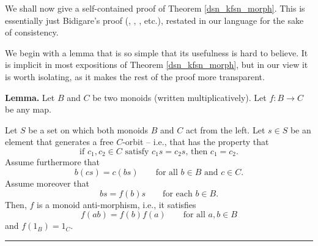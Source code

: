 \documentclass[12pt]{article}
\theoremstyle{definition}%
\newtheorem{lem}[thm]{Lemma}
\theoremstyle{definition}%
\theoremstyle{remark}%
\newcommand{\tup}[1]{\left( #1 \right)}
\newenvironment{lem}[1][Lemma]{\noindent\textbf{#1.} }{\ \rule{0.5em}{0.5em}}
\begin{document}
We shall now give a self-contained proof of Theorem \ref{dsn_kfsn_morph}.
This is essentially just
Bidigare's proof (\cite[Theorem 3.8.1]{Bidigare-thesis},
\cite[proof of Theorem 2.1]{Saliola}, \cite[Theorem 1]{Hsiao}, etc.),
restated in our language for the sake of consistency.

We begin with a lemma that is so simple that its usefulness is hard to
believe. It is implicit in most expositions of Theorem \ref{dsn_kfsn_morph},
but in our view it is worth isolating, as it makes the rest of the proof
more transparent.

\begin{lem}
\label{lem.rho.monoid}
Let $B$ and $C$ be two monoids (written
multiplicatively).
Let $f:B\to C$ be any map.

Let $S$ be a set on which both monoids $B$ and $C$ act from the left. Let
$s\in S$ be an element that generates a free $C$-orbit -- i.e., that has the
property that
\begin{equation}
\text{if }c_{1},c_{2}\in C\text{ satisfy }c_{1}s=c_{2}s\text{, then }
c_{1}=c_{2}\text{.}
\label{eq.lem.rho.monoid.free}
\end{equation}
Assume furthermore that
\begin{equation}
b\tup{cs} = c\tup{bs}
\qquad\text{for all }b\in B\text{ and }c\in C.
\label{eq.lem.rho.monoid.bcs}
\end{equation}
Assume moreover that
\begin{equation}
bs=f\tup{b}   s
\qquad\text{for each }b\in B.
\label{eq.lem.rho.monoid.rhobs}
\end{equation}
Then, $f$ is a monoid anti-morphism, i.e., it satisfies
\[
f\tup{ab}  =f\tup{b}   f\tup{a} 
\qquad\text{for all }a,b\in B
\]
and $f\left(  1_{B}\right)  =1_{C}$.
\end{lem}
\end{document}
